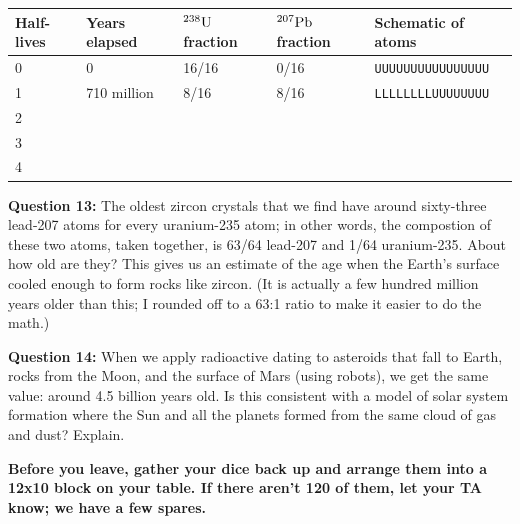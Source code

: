 \documentclass[11pt]{article}
\begin{document}
\Large
\begin{tabular}{|l|l|l|l|l|}
\hline
Half-lives & Years elapsed & ${}^{238}\rm U$ fraction & ${}^{207}\rm Pb$ fraction & Schematic of atoms                          \\ \hline
0                                   & 0                              & 16/16                                            & 0/16                                          & {\tt UUUUUUUUUUUUUUUU} \\\hline
1                                   & 710 million                    & 8/16                                             & 8/16                                          & {\tt LLLLLLLLUUUUUUUU} \\\hline
2                                   &                                &                                                  &                                               &                                             \\\hline
3                                   &                                &                                                  &                                               &                                             \\\hline
4                                   &                                &                                                  &                                               &                                             \\\hline
\end{tabular}

\normalsize\vspace{1.5in}

{\bf Question 13:} The oldest zircon crystals that we find have around sixty-three lead-207 atoms for every uranium-235 atom; in other words, the
compostion of these two atoms, taken together, is 63/64 lead-207 and 1/64 uranium-235.
 About how old are they? This gives us an estimate of the age when the Earth's surface cooled enough to form rocks like 
zircon. (It is actually a few hundred million years older than this; I rounded off to a 63:1 ratio to make it easier to do the math.)

\vspace{1.2in}

{\bf Question 14:} When we apply radioactive dating to asteroids that fall to Earth, rocks from the Moon, and the surface of Mars (using robots), we get the same value: around 4.5 billion years old. Is this consistent with a model of solar system formation where the Sun and all the planets formed from the same cloud of gas and dust? Explain.

\vspace{1.5in}

{\bf Before you leave, gather your dice back up and arrange them into a 12x10 block on your table. If there aren't 120 of them, let your TA know; we have a few spares.}
\end{document}
